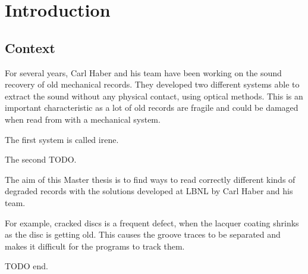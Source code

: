 
\chapter{Introduction}

\section{Context}

For several years, Carl Haber and his team have been working on the sound recovery of old mechanical records. They developed two different systems able to extract the sound without any physical contact, using optical methods. This is an important characteristic as a lot of old records are fragile and could be damaged when read from with a mechanical system.

The first system is called \gls{irene}.

The second TODO.

The aim of this Master thesis is to find ways to read correctly different kinds of degraded records with the solutions developed at LBNL by Carl Haber and his team.

For example, cracked discs is a frequent defect, when the lacquer coating shrinks as the disc is getting old. This causes the groove traces to be separated and makes it difficult for the programs to track them.

TODO end.





%
%
%
%

